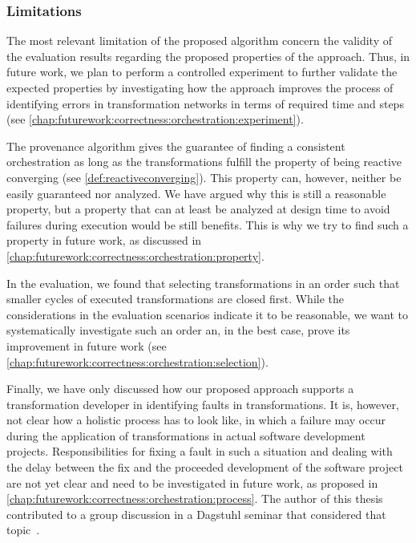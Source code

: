 \subsubsection{Limitations}
\label{chap:correctness_evaluation:orchestration:discussion:limitations}

The most relevant limitation of the proposed algorithm concern the validity of the evaluation results regarding the proposed properties of the approach.
Thus, in future work, we plan to perform a controlled experiment to further validate the expected properties by investigating how the approach improves the process of identifying errors in transformation networks in terms of required time and steps (see \autoref{chap:futurework:correctness:orchestration:experiment}).

The provenance algorithm gives the guarantee of finding a consistent orchestration as long as the transformations fulfill the property of being reactive converging (see \autoref{def:reactiveconverging}).
This property can, however, neither be easily guaranteed nor analyzed.
We have argued why this is still a reasonable property, but a property that can at least be analyzed at design time to avoid failures during execution would be still benefits.
This is why we try to find such a property in future work, as discussed in \autoref{chap:futurework:correctness:orchestration:property}.

In the evaluation, we found that selecting transformations in an order such that smaller cycles of executed transformations are closed first.
While the considerations in the evaluation scenarios indicate it to be reasonable, we want to systematically investigate such an order an, in the best case, prove its improvement in future work (see \autoref{chap:futurework:correctness:orchestration:selection}).

Finally, we have only discussed how our proposed approach supports a transformation developer in identifying faults in transformations.
It is, however, not clear how a holistic process has to look like, in which a failure may occur during the application of transformations in actual software development projects.
Responsibilities for fixing a fault in such a situation and dealing with the delay between the fix and the proceeded development of the software project are not yet clear and need to be investigated in future work, as proposed in \autoref{chap:futurework:correctness:orchestration:process}.
The author of this thesis contributed to a group discussion in a Dagstuhl seminar that considered that topic~.
